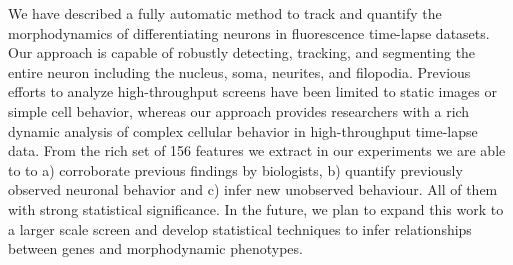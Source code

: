 We have described a  fully  automatic  method to  track  and  quantify  the
morphodynamics of  differentiating neurons in  fluorescence time-lapse
datasets.     Our  approach is capable of robustly detecting,
tracking, and segmenting the entire neuron including 
the nucleus, soma, neurites, and filopodia.  Previous efforts to analyze
high-throughput screens have been limited to static images or simple cell
behavior, whereas our approach provides researchers with a rich dynamic 
analysis of complex cellular behavior in high-throughput time-lapse data.
From the rich set of 156 features we extract in our experiments we are able to
 to a) corroborate previous findings by biologists, b) quantify previously observed neuronal behavior and c) infer new unobserved behaviour. All of them with strong statistical significance.
In the future, we plan to expand this
work to a larger scale screen and develop statistical techniques to 
infer relationships between genes and morphodynamic phenotypes.











